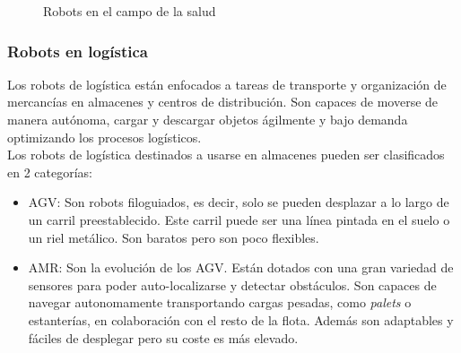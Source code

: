 \begin{figure} [ht!]
  \centering    
  \hspace{1cm}
  \hspace{1cm}
  \caption{Robots en el campo de la salud}
\end{figure}


\subsubsection{Robots en logística}
Los robots de logística están enfocados a tareas de transporte y organización de mercancías en almacenes y centros de distribución. 
Son capaces de moverse de manera autónoma, cargar y descargar objetos ágilmente y bajo demanda optimizando los procesos logísticos. 
\\Los robots de logística destinados a usarse en almacenes pueden ser clasificados en 2 categorías:
\begin{itemize}
\item \ac{AGV}: Son robots filoguiados, es decir, solo se pueden desplazar a lo largo de un carril preestablecido. Este carril puede ser 
una línea pintada en el suelo o un riel metálico. Son baratos pero son poco flexibles.
\item \ac{AMR}: Son la evolución de los \acs{AGV}. Están dotados con una gran variedad de sensores para poder auto-localizarse y 
detectar obstáculos. Son capaces de navegar autonomamente transportando cargas pesadas, como \textit{palets} o estanterías, en colaboración 
con el resto de la flota. Además son adaptables y fáciles de desplegar pero su coste es más elevado.
\end{itemize}

